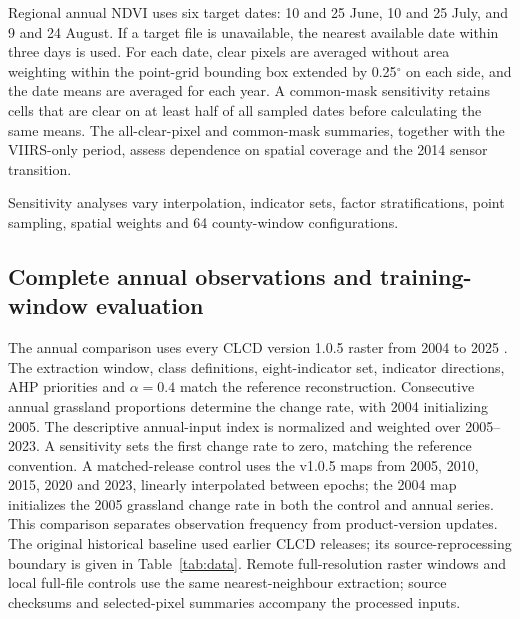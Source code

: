 \documentclass[preprint,11pt,authoryear]{elsarticle}
\begin{document}
Regional annual NDVI uses six target dates: 10 and 25 June, 10 and 25 July, and 9 and 24 August. If a target file is unavailable, the nearest available date within three days is used. For each date, clear pixels are averaged without area weighting within the point-grid bounding box extended by 0.25$^\circ$ on each side, and the date means are averaged for each year. A common-mask sensitivity retains cells that are clear on at least half of all sampled dates before calculating the same means. The all-clear-pixel and common-mask summaries, together with the VIIRS-only period, assess dependence on spatial coverage and the 2014 sensor transition.

Sensitivity analyses vary interpolation, indicator sets, factor stratifications, point sampling, spatial weights and 64 county-window configurations.


\subsection{Complete annual observations and training-window evaluation}
\label{sec:annual-methods}
The annual comparison uses every CLCD version 1.0.5 raster from 2004 to 2025 \citep{yang2026clcd}. The extraction window, class definitions, eight-indicator set, indicator directions, AHP priorities and $\alpha=0.4$ match the reference reconstruction. Consecutive annual grassland proportions determine the change rate, with 2004 initializing 2005. The descriptive annual-input index is normalized and weighted over 2005--2023. A sensitivity sets the first change rate to zero, matching the reference convention. A matched-release control uses the v1.0.5 maps from 2005, 2010, 2015, 2020 and 2023, linearly interpolated between epochs; the 2004 map initializes the 2005 grassland change rate in both the control and annual series. This comparison separates observation frequency from product-version updates. The original historical baseline used earlier CLCD releases; its source-reprocessing boundary is given in Table~\ref{tab:data}. Remote full-resolution raster windows and local full-file controls use the same nearest-neighbour extraction; source checksums and selected-pixel summaries accompany the processed inputs.
\end{document}
